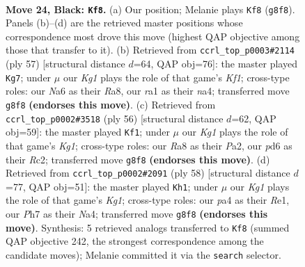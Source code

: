 \documentclass[11pt]{article}
\begin{document}
\clearpage

\begin{figure}[p]\centering
\begin{subfigure}{0.46\textwidth}\centering
\resizebox{\linewidth}{!}{%
\newchessgame
\chessboard[
  setfen={r2q2kr/3R3p/n2P4/2pQ4/P5P1/2N5/1P6/R3K3 b Q - 0 24},
  showmover=false,
  pgfstyle=straightmove, color=movearrow, markmove={g8-f8}
]}
\caption{}
\end{subfigure}\hfill
\begin{subfigure}{0.46\textwidth}\centering
\resizebox{\linewidth}{!}{%
\newchessgame
\chessboard[
  setfen={r4kr1/p4q2/4R3/2Q5/Np5P/8/PP3P2/4K2b b - - 8 29},
  showmover=false,
  pgfstyle=straightmove, color=movearrow, markmove={f8-g7}
]}
\caption{}
\end{subfigure}
\\[4pt]
\begin{subfigure}{0.46\textwidth}\centering
\resizebox{\linewidth}{!}{%
\newchessgame
\chessboard[
  setfen={5rk1/p6p/6pP/6r1/3q4/2Q5/P1R2P2/4R1K1 w - - 2 29},
  showmover=false,
  pgfstyle=straightmove, color=movearrow, markmove={g1-f1}
]}
\caption{}
\end{subfigure}\hfill
\begin{subfigure}{0.46\textwidth}\centering
\resizebox{\linewidth}{!}{%
\newchessgame
\chessboard[
  setfen={3r1rk1/p5p1/7p/4P3/Np2Q3/6q1/PP6/4RRK1 w - - 0 30},
  showmover=false,
  pgfstyle=straightmove, color=movearrow, markmove={g1-h1}
]}
\caption{}
\end{subfigure}
\caption{\textbf{Move 24, Black: \texttt{Kf8}.} (a) Our position; Melanie plays \texttt{Kf8} (\texttt{g8f8}). Panels (b)--(d) are the retrieved master positions whose correspondence most drove this move (highest QAP objective among those that transfer to it). (b) Retrieved from \texttt{ccrl\_top\_p0003\#2114} (ply 57) [structural distance $d$=64, QAP obj=76]: the master played \texttt{Kg7}; under $\mu$ our \emph{Kg1} plays the role of that game's \emph{Kf1}; cross-type roles: our \emph{N}a6 as their \emph{R}a8, our \emph{r}a1 as their \emph{n}a4; transferred move \texttt{g8f8} \textbf{(endorses this move)}. (c) Retrieved from \texttt{ccrl\_top\_p0002\#3518} (ply 56) [structural distance $d$=62, QAP obj=59]: the master played \texttt{Kf1}; under $\mu$ our \emph{Kg1} plays the role of that game's \emph{Kg1}; cross-type roles: our \emph{R}a8 as their \emph{P}a2, our \emph{p}d6 as their \emph{R}c2; transferred move \texttt{g8f8} \textbf{(endorses this move)}. (d) Retrieved from \texttt{ccrl\_top\_p0002\#2091} (ply 58) [structural distance $d$=77, QAP obj=51]: the master played \texttt{Kh1}; under $\mu$ our \emph{Kg1} plays the role of that game's \emph{Kg1}; cross-type roles: our \emph{p}a4 as their \emph{R}e1, our \emph{P}h7 as their \emph{N}a4; transferred move \texttt{g8f8} \textbf{(endorses this move)}. Synthesis: 5 retrieved analogs transferred to \texttt{Kf8} (summed QAP objective 242, the strongest correspondence among the candidate moves); Melanie committed it via the \texttt{search} selector.}
\label{fig:thought-m47}
\end{figure}
\end{document}
